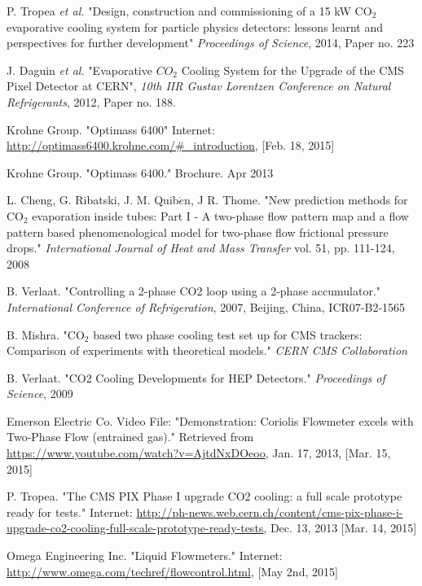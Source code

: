 \documentclass{report}
\begin{document}
\begin{thebibliography}{9}
P. Tropea \textit{et al.} "Design, construction and commissioning of a 15 kW CO$_2$ evaporative cooling system for particle physics detectors: lessons learnt and perspectives for further development" \textit{Proceedings of Science}, 2014, Paper no. 223

J. Daguin \textit{et al.} "Evaporative $CO_2$ Cooling System for the Upgrade of the CMS Pixel Detector at CERN", \textit{10th IIR Gustav Lorentzen Conference on Natural Refrigerants}, 2012, Paper no. 188.

Krohne Group. "Optimass 6400" Internet: \underline{http://optimass6400.krohne.com/\#\_introduction}, [Feb. 18, 2015]

Krohne Group. "Optimass 6400." Brochure. Apr 2013

L. Cheng, G. Ribatski, J. M. Quib$\acute{e}$n, J R. Thome. "New prediction methods for CO$_2$ evaporation inside tubes: Part I - A two-phase flow pattern map and a flow pattern based phenomenological model for two-phase flow frictional pressure drops." \textit{International Journal of Heat and Mass Transfer} vol. 51, pp. 111-124, 2008

B. Verlaat. "Controlling a 2-phase CO2 loop using a 2-phase accumulator." \textit{International Conference of Refrigeration}, 2007, Beijing, China, ICR07-B2-1565 

B. Mishra. "CO$_2$ based two phase cooling test set up for CMS trackers: Comparison of experiments with theoretical models." \textit{CERN CMS Collaboration}

B. Verlaat. "CO2 Cooling Developments for HEP Detectors." \textit{Proceedings of Science}, 2009

Emerson Electric Co. Video File: "Demonstration: Coriolis Flowmeter excels with Two-Phase Flow (entrained gas)." Retrieved from \underline{https://www.youtube.com/watch?v=AjtdNxDOeoo}, Jan. 17, 2013, [Mar. 15, 2015]

P. Tropea. "The CMS PIX Phase I upgrade CO2 cooling: a full scale prototype ready for tests." Internet: \underline{http://ph-news.web.cern.ch/content/cms-pix-phase-i-upgrade-co2-cooling-full-scale-prototype-ready-tests}, Dec. 13, 2013 [Mar. 14, 2015] 

Omega Engineering Inc. "Liquid Flowmeters." Internet: \underline{http://www.omega.com/techref/flowcontrol.html}, [May 2nd, 2015]


\end{thebibliography}
\end{document}
